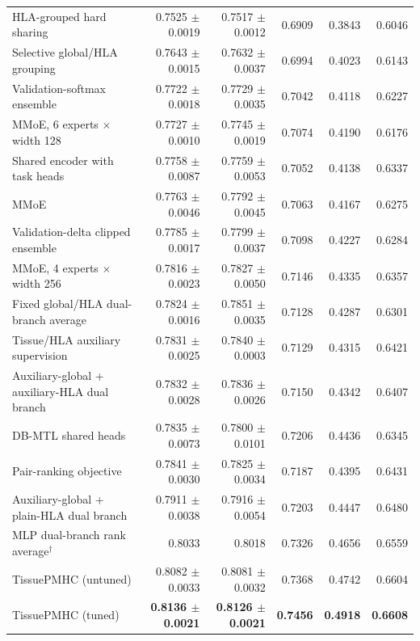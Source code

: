 \begin{table}[tbp]
\begin{tabularx}{\textwidth}{>{\raggedright\arraybackslash}Xrrrrr}
HLA-grouped hard sharing & 0.7525 $\pm$ 0.0019 & 0.7517 $\pm$ 0.0012 & 0.6909 & 0.3843 & 0.6046 \\
Selective global/HLA grouping & 0.7643 $\pm$ 0.0015 & 0.7632 $\pm$ 0.0037 & 0.6994 & 0.4023 & 0.6143 \\
Validation-softmax ensemble & 0.7722 $\pm$ 0.0018 & 0.7729 $\pm$ 0.0035 & 0.7042 & 0.4118 & 0.6227 \\
MMoE, 6 experts $\times$ width 128 & 0.7727 $\pm$ 0.0010 & 0.7745 $\pm$ 0.0019 & 0.7074 & 0.4190 & 0.6176 \\
Shared encoder with task heads & 0.7758 $\pm$ 0.0087 & 0.7759 $\pm$ 0.0053 & 0.7052 & 0.4138 & 0.6337 \\
MMoE & 0.7763 $\pm$ 0.0046 & 0.7792 $\pm$ 0.0045 & 0.7063 & 0.4167 & 0.6275 \\
Validation-delta clipped ensemble & 0.7785 $\pm$ 0.0017 & 0.7799 $\pm$ 0.0037 & 0.7098 & 0.4227 & 0.6284 \\
MMoE, 4 experts $\times$ width 256 & 0.7816 $\pm$ 0.0023 & 0.7827 $\pm$ 0.0050 & 0.7146 & 0.4335 & 0.6357 \\
Fixed global/HLA dual-branch average & 0.7824 $\pm$ 0.0016 & 0.7851 $\pm$ 0.0035 & 0.7128 & 0.4287 & 0.6301 \\
Tissue/HLA auxiliary supervision & 0.7831 $\pm$ 0.0025 & 0.7840 $\pm$ 0.0003 & 0.7129 & 0.4315 & 0.6421 \\
Auxiliary-global + auxiliary-HLA dual branch & 0.7832 $\pm$ 0.0028 & 0.7836 $\pm$ 0.0026 & 0.7150 & 0.4342 & 0.6407 \\
DB-MTL shared heads & 0.7835 $\pm$ 0.0073 & 0.7800 $\pm$ 0.0101 & 0.7206 & 0.4436 & 0.6345 \\
Pair-ranking objective & 0.7841 $\pm$ 0.0030 & 0.7825 $\pm$ 0.0034 & 0.7187 & 0.4395 & 0.6431 \\
Auxiliary-global + plain-HLA dual branch & 0.7911 $\pm$ 0.0038 & 0.7916 $\pm$ 0.0054 & 0.7203 & 0.4447 & 0.6480 \\
MLP dual-branch rank average$^\dagger$ & 0.8033 & 0.8018 & 0.7326 & 0.4656 & 0.6559 \\
TissuePMHC (untuned) & 0.8082 $\pm$ 0.0033 & 0.8081 $\pm$ 0.0032 & 0.7368 & 0.4742 & 0.6604 \\
TissuePMHC (tuned) & \textbf{0.8136 $\pm$ 0.0021} & \textbf{0.8126 $\pm$ 0.0021} & \textbf{0.7456} & \textbf{0.4918} & \textbf{0.6608} \\
\bottomrule
\end{tabularx}
\end{table}
\FloatBarrier

